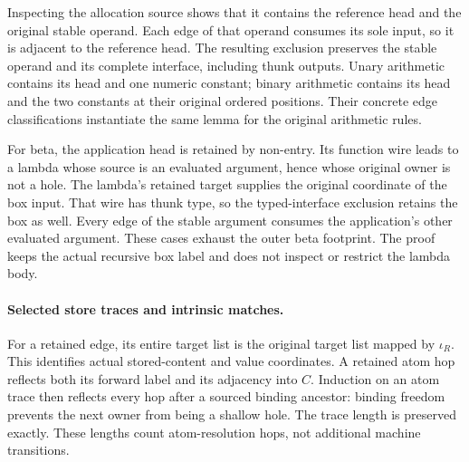 Inspecting the allocation source shows that it contains the reference head
and the original stable operand. Each edge of that operand consumes its sole
input, so it is adjacent to the reference head. The resulting exclusion
preserves the stable operand and its complete interface, including thunk
outputs. Unary arithmetic contains its head and one numeric constant;
binary arithmetic contains its head and the two constants at their original
ordered positions. Their concrete edge classifications instantiate the same
lemma for the original arithmetic rules.
\par{}

For beta, the application head is retained by non-entry. Its function wire
leads to a lambda whose source is an evaluated argument, hence whose original
owner is not a hole. The lambda's retained target supplies the original
coordinate of the box input. That wire has thunk type, so the typed-interface
exclusion retains the box as well. Every edge of the stable argument consumes
the application's other evaluated argument. These cases exhaust the outer
beta footprint. The proof keeps the actual recursive box label and does not
inspect or restrict the lambda body.

\paragraph{Selected store traces and intrinsic matches.}
For a retained edge, its entire target list is the original target list mapped
by $\iota_R$. This identifies actual stored-content and value coordinates.
A retained atom hop reflects both its forward label and its adjacency into
$C$. Induction on an atom trace then reflects every hop after a sourced
binding ancestor: binding freedom prevents the next owner from being a
shallow hole. The trace length is preserved exactly. These lengths count
atom-resolution hops, not additional machine transitions.

